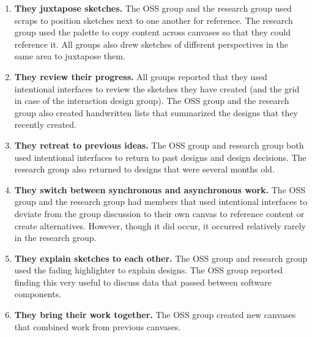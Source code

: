 \documentclass[12pt,fleqn]{ucithesis}
\begin{document}
\begin{enumerate}
	\item \textbf{They juxtapose sketches.} The OSS group and the research group used scraps to position sketches next to one another for reference. The research group used the palette to copy content across canvases so that they could reference it. All groups also drew sketches of different perspectives in the same area to juxtapose them.
	\item \textbf{They review their progress.} All groups reported that they used intentional interfaces to review the sketches they have created (and the grid in case of the interaction design group). The OSS group and the research group also created handwritten lists that summarized the designs that they recently created.
	\item \textbf{They retreat to previous ideas.} The OSS group and research group both used intentional interfaces to return to past designs and design decisions. The research group also returned to designs that were several months old.
	\item \textbf{They switch between synchronous and asynchronous work.} The OSS group and the research group had members that used intentional interfaces to deviate from the group discussion to their own canvas to reference content or create alternatives. However, though it did occur, it occurred relatively rarely in the research group. 
	\item \textbf{They explain sketches to each other.} The OSS group and research group used the fading highlighter to explain designs. The OSS group reported finding this very useful to discuss data that passed between software components. 
	\item \textbf{They bring their work together.} The OSS group created new canvases that combined work from previous canvases.
\end{enumerate}
\end{document}
